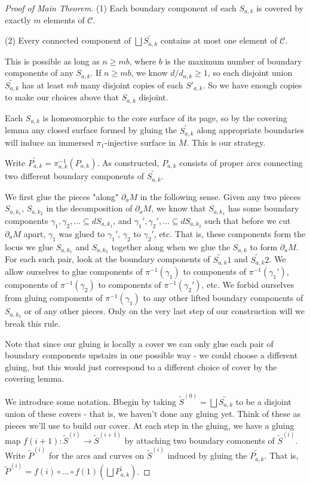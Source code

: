 \documentclass[12pt]{amsart}
\theoremstyle{definition}
\theoremstyle{remark}
\newcommand{\bd}{\partial}
\newcommand{\cin}{\subseteq}
\newcommand{\cC}{\mathcal{C}}
\begin{document}
\begin{proof}[Proof of Main Theorem]
(1) Each boundary component of each $S_{a,k}$ is covered by exactly $m$ elements
of $\cC$.

(2) Every connected component of $\bigsqcup \widetilde{S_{a,k}}$ contains at most one element
of $\cC$.

This is possible as long as $n \geq mb$, where $b$ is the maximum number of
boundary components of any $S_{a,k}$. If $n\geq mb$, we know $d/d_{a,k} \geq
1$, so each disjoint union $\widetilde{S_{a,k}}$ has at least $mb$ many
disjoint copies of each $S'_{a,k}$.  So we have enough copies to make our choices
above that $S_{a,k}$ disjoint.

Each $S_{a,k}$ is homeomorphic to the core surface of its page, so by the covering
lemma any closed surface formed by gluing the $\widetilde{S_{a,k}}$ along appropriate
boundaries will induce an immersed $\pi_1$-injective surface in $M$. This is
our strategy.

Write $\widetilde{P_{a,k}}=\pi_{a,k}^{-1}(P_{a,k})$. As constructed, $P_{a,k}$ consists of proper arcs
connecting two different boundary components of $\widetilde{S_{a,k}}$.

We first glue the pieces "along" $\bd_aM$ in the following sense. Given any two
pieces $S_{a,k_1}$, $S_{a,k_2}$ in the decomposition of $\bd_aM$, we know that
$S_{a,k_1}$ has some boundary components $\gamma_1,\gamma_2,\dots \cin
dS_{a,k_1}$, and $\gamma_1',\gamma_2',\dots \cin dS_{a,k_2}$ such that before we
cut $\bd_aM$ apart, $\gamma_1$ was glued to $\gamma_1'$, $\gamma_2$ to
$\gamma_2'$, etc.  That is, these components form the locus we glue $S_{a,k_1}$
and $S_{a,k_2}$ together along when we glue the $S_{a,k}$ to form $\bd_aM$.  For
each such pair, look at the boundary components of $\widetilde{S_{a,k}}1$ and
$\widetilde{S_{a,k}}2$.  We allow ourselves to glue components of
$\pi^{-1}(\gamma_1)$ to components of $\pi^{-1}(\gamma_1')$, components of
$\pi^{-1}(\gamma_2)$ to components of $\pi^{-1}(\gamma_2')$, etc. We forbid
ourselves from gluing components of $\pi^{-1}(\gamma_1)$ to any other lifted
boundary components of $S_{a,k_2}$ or of any other pieces. Only on the very last
step of our construction will we break this rule.

Note that since our gluing is locally a cover we can only glue each pair of
boundary components upstairs in one possible way - we could choose a different
gluing, but this would just correspond to a different choice of cover by the
covering lemma.

We introduce some notation. Bbegin by taking $\widetilde{S}^{(0)} = \bigsqcup \widetilde{S_{a,k}}$ to
be a disjoint union of these covers - that is, we haven't done any gluing yet.
Think of these as pieces we'll use to build our cover. At each step in the
gluing, we have a gluing map $f(i+1) \colon \widetilde{S}^{(i)} \to
\widetilde{S}^{(i+1)}$ by attaching two boundary comonents of
$\widetilde{S}^{(i)}$. Write $\widetilde{P}^{(i)}$ for the arcs and curves on
$\widetilde{S}^{(i)}$ induced by gluing the $\widetilde{P_{a,k}}$.  That is,
$\widetilde{P}^{(i)} = f(i) \circ ...  \circ f(1) (\bigsqcup
\widetilde{P_{a,k}})$.


\end{proof}
\end{document}
